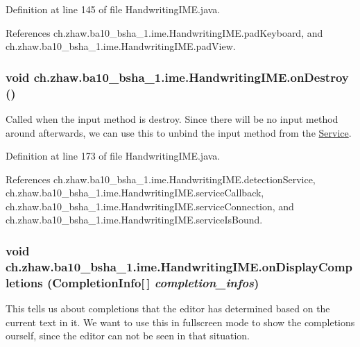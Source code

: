 Definition at line 145 of file HandwritingIME.java.

References ch.zhaw.ba10\_\-bsha\_\-1.ime.HandwritingIME.padKeyboard, and ch.zhaw.ba10\_\-bsha\_\-1.ime.HandwritingIME.padView.\hypertarget{classch_1_1zhaw_1_1ba10__bsha__1_1_1ime_1_1HandwritingIME_a35c873d879f2440e2a98e2dbca31202f}{
\subsubsection[{onDestroy}]{\setlength{\rightskip}{0pt plus 5cm}void ch.zhaw.ba10\_\-bsha\_\-1.ime.HandwritingIME.onDestroy ()}}
\label{classch_1_1zhaw_1_1ba10__bsha__1_1_1ime_1_1HandwritingIME_a35c873d879f2440e2a98e2dbca31202f}
Called when the input method is destroy. Since there will be no input method around afterwards, we can use this to unbind the input method from the \hyperlink{}{Service}. 

Definition at line 173 of file HandwritingIME.java.

References ch.zhaw.ba10\_\-bsha\_\-1.ime.HandwritingIME.detectionService, ch.zhaw.ba10\_\-bsha\_\-1.ime.HandwritingIME.serviceCallback, ch.zhaw.ba10\_\-bsha\_\-1.ime.HandwritingIME.serviceConnection, and ch.zhaw.ba10\_\-bsha\_\-1.ime.HandwritingIME.serviceIsBound.\hypertarget{classch_1_1zhaw_1_1ba10__bsha__1_1_1ime_1_1HandwritingIME_a5e02e524ed9e962644d630cc0facda16}{
\subsubsection[{onDisplayCompletions}]{\setlength{\rightskip}{0pt plus 5cm}void ch.zhaw.ba10\_\-bsha\_\-1.ime.HandwritingIME.onDisplayCompletions (CompletionInfo\mbox{[}$\,$\mbox{]} {\em completion\_\-infos})}}
\label{classch_1_1zhaw_1_1ba10__bsha__1_1_1ime_1_1HandwritingIME_a5e02e524ed9e962644d630cc0facda16}
This tells us about completions that the editor has determined based on the current text in it. We want to use this in fullscreen mode to show the completions ourself, since the editor can not be seen in that situation. 

